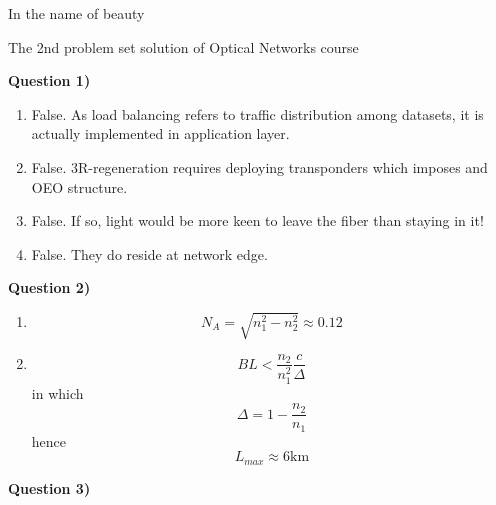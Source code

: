 \documentclass[10pt,letterpaper]{article}
\newcommand{\Q}[1]{\textbf{Question #1)}}
\begin{document}
\Large
\begin{center}
In the name of beauty

The 2nd problem set solution of Optical Networks course

\hrulefill
\end{center}
\Q1

\begin{enumerate}[label=\alph*)]
\item
False. As load balancing refers to traffic distribution among datasets, it is actually implemented in application layer.
\item
False. 3R-regeneration requires deploying transponders which imposes and OEO structure.
\item
False. If so, light would be more keen to leave the fiber than staying in it!
\item
False. They do reside at network edge.
\end{enumerate}

\Q2

\begin{enumerate}[label=\alph*.]
\item
$$
N_A=\sqrt{n_1^2-n_2^2}\approx0.12
$$
\item
$$
BL<\frac{n_2}{n_1^2}\frac{c}{\Delta}
$$
in which
$$
\Delta=1-\frac{n_2}{n_1}
$$
hence
$$
L_{max}\approx 6\text{km}
$$
\end{enumerate}

\Q3
\end{document}
